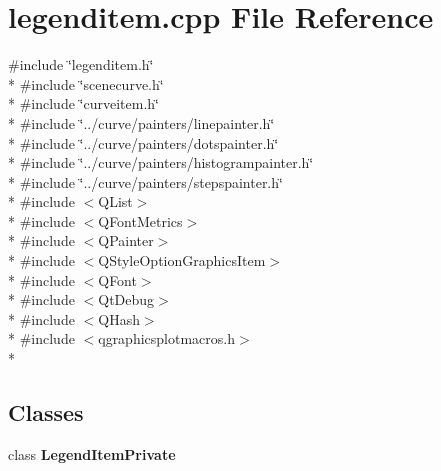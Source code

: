 \section{legenditem.\+cpp File Reference}
\label{items_2legenditem_8cpp}
{\ttfamily \#include \char`\"{}legenditem.\+h\char`\"{}}\\*
{\ttfamily \#include \char`\"{}scenecurve.\+h\char`\"{}}\\*
{\ttfamily \#include \char`\"{}curveitem.\+h\char`\"{}}\\*
{\ttfamily \#include \char`\"{}../curve/painters/linepainter.\+h\char`\"{}}\\*
{\ttfamily \#include \char`\"{}../curve/painters/dotspainter.\+h\char`\"{}}\\*
{\ttfamily \#include \char`\"{}../curve/painters/histogrampainter.\+h\char`\"{}}\\*
{\ttfamily \#include \char`\"{}../curve/painters/stepspainter.\+h\char`\"{}}\\*
{\ttfamily \#include $<$Q\+List$>$}\\*
{\ttfamily \#include $<$Q\+Font\+Metrics$>$}\\*
{\ttfamily \#include $<$Q\+Painter$>$}\\*
{\ttfamily \#include $<$Q\+Style\+Option\+Graphics\+Item$>$}\\*
{\ttfamily \#include $<$Q\+Font$>$}\\*
{\ttfamily \#include $<$Qt\+Debug$>$}\\*
{\ttfamily \#include $<$Q\+Hash$>$}\\*
{\ttfamily \#include $<$qgraphicsplotmacros.\+h$>$}\\*
\subsection*{Classes}
\begin{DoxyCompactItemize}
\item 
class {\bf Legend\+Item\+Private}
\end{DoxyCompactItemize}

